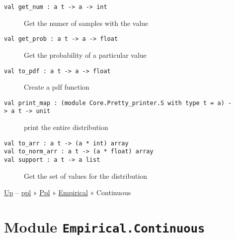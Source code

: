 \begin{description}
\item[{\protect\hyperlink{val-getux5fnum}{}\texttt{val\ get\_num\ :\ \textquotesingle{}a\ t\ -\textgreater{}\ \textquotesingle{}a\ -\textgreater{}\ int}}]
Get the numer of samples with the value
\end{description}

\begin{description}
\item[{\protect\hyperlink{val-getux5fprob}{}\texttt{val\ get\_prob\ :\ \textquotesingle{}a\ t\ -\textgreater{}\ \textquotesingle{}a\ -\textgreater{}\ float}}]
Get the probability of a particular value
\end{description}

\begin{description}
\item[{\protect\hyperlink{val-toux5fpdf}{}\texttt{val\ to\_pdf\ :\ \textquotesingle{}a\ t\ -\textgreater{}\ \textquotesingle{}a\ -\textgreater{}\ float}}]
Create a pdf function
\end{description}

\begin{description}
\item[{\protect\hyperlink{val-printux5fmap}{}\texttt{val\ print\_map\ :\ (module\ Core.Pretty\_printer.S\ with\ type\ t\ =\ \textquotesingle{}a)\ -\textgreater{}\ \textquotesingle{}a\ t\ -\textgreater{}\ unit}}]
print the entire distribution
\end{description}

\begin{description}
\item[{\protect\hyperlink{val-toux5farr}{}\texttt{val\ to\_arr\ :\ \textquotesingle{}a\ t\ -\textgreater{}\ (\textquotesingle{}a\ *\ int)\ array}\\
\protect\hyperlink{val-toux5fnormux5farr}{}\texttt{val\ to\_norm\_arr\ :\ \textquotesingle{}a\ t\ -\textgreater{}\ (\textquotesingle{}a\ *\ float)\ array}\\
\protect\hyperlink{val-support}{}\texttt{val\ support\ :\ \textquotesingle{}a\ t\ -\textgreater{}\ \textquotesingle{}a\ list}}]
Get the set of values for the distribution
\end{description}

\href{../index.html}{Up} -- \href{../../../index.html}{ppl} »
\href{../../index.html}{Ppl} » \href{../index.html}{Empirical} »
Continuous

\section{\texorpdfstring{Module
\texttt{Empirical.Continuous}}{Module Empirical.Continuous}}\label{module-empirical.continuous}

